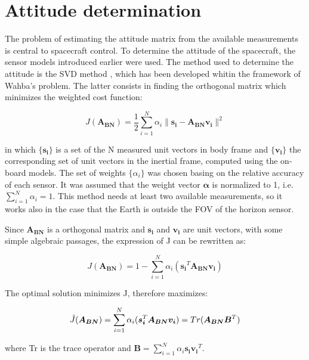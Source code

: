 \section{Attitude determination}
\label{subsec:attitude_det}

The problem of estimating the attitude matrix from the available measurements is central to spacecraft control. To determine the attitude of the spacecraft, the sensor models introduced earlier were used. The method used to determine the attitude is the SVD method \cite{crass_book}, which has been developed whitin the framework of Wahba's problem. The latter consists in finding the orthogonal matrix which minimizes the weighted cost function:

\begin{equation}
    J(\boldsymbol{A_{BN}})=\frac{1}{2}\sum_{i=1}^N\alpha_i\lVert \boldsymbol{s_i} - \boldsymbol{A_{BN}v_i} \rVert^2
\end{equation}

in which $\{\boldsymbol{s_i}\}$ is a set of the N measured unit vectors in body frame and $\{\boldsymbol{v_i}\}$ the corresponding set of unit vectors in the inertial frame, computed using the on-board models. The set of weights $\{\alpha_i\}$ was chosen basing on the relative accuracy of each sensor. It was assumed that the weight vector $\boldsymbol{\alpha}$ is normalized to 1, i.e. $\sum_{i=1}^N\alpha_i=1$. This method needs at least two available measurements, so it works also in the case that the Earth is outside the FOV of the horizon sensor.

Since $\boldsymbol{A_{BN}}$ is a orthogonal matrix and $\boldsymbol{s_i}$ and $\boldsymbol{v_i}$ are unit vectors, with some simple algebraic passages, the expression of J can be rewritten as:

\begin{equation}
    J(\boldsymbol{A_{BN}})=1-\sum_{i=1}^N\alpha_i(\boldsymbol{s_i}^T\boldsymbol{A_{BN}}\boldsymbol{v_i})
\end{equation}

The optimal solution minimizes J, therefore maximizes:

\begin{equation}
    \Tilde{J}(\boldsymbol{A_{BN}})=\sum_{i=1}^N\alpha_i(\boldsymbol{s_i}^T\boldsymbol{A_{BN}}\boldsymbol{v_i})=Tr(\boldsymbol{A_{BN}}\boldsymbol{B}^T)
\end{equation}

where Tr is the trace operator and $\boldsymbol{B}=\sum_{i=1}^N\alpha_i\boldsymbol{s_iv_i}^T$.

